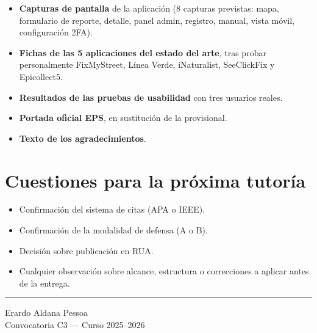 \begin{itemize}[leftmargin=1.2cm, itemsep=2pt]
  \item \textbf{Capturas de pantalla} de la aplicación (8 capturas previstas: mapa, formulario de reporte, detalle, panel admin, registro, manual, vista móvil, configuración 2FA).
  \item \textbf{Fichas de las 5 aplicaciones del estado del arte}, tras probar personalmente FixMyStreet, Línea Verde, iNaturalist, SeeClickFix y Epicollect5.
  \item \textbf{Resultados de las pruebas de usabilidad} con tres usuarios reales.
  \item \textbf{Portada oficial EPS}, en sustitución de la provisional.
  \item \textbf{Texto de los agradecimientos}.
\end{itemize}


\section*{Cuestiones para la próxima tutoría}

\begin{itemize}[leftmargin=1.2cm, itemsep=2pt]
  \item Confirmación del sistema de citas (APA o IEEE).
  \item Confirmación de la modalidad de defensa (A o B).
  \item Decisión sobre publicación en RUA.
  \item Cualquier observación sobre alcance, estructura o correcciones a aplicar antes de la entrega.
\end{itemize}

\noindent\rule{\textwidth}{0.4pt}
\begin{flushright}
\small Erardo Aldana Pessoa\\
Convocatoria C3 — Curso 2025--2026
\end{flushright}
